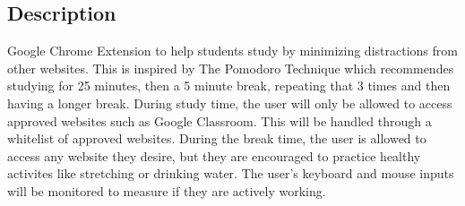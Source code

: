 \documentclass[12pt]{article}
\begin{document}
\subsection{Description}
Google Chrome Extension to help students study by minimizing distractions from other websites.
This is inspired by The Pomodoro Technique which recommendes studying for 25 minutes, then a 5 minute break, repeating that 3 times and then having a longer break.
During study time, the user will only be allowed to access approved websites such as Google Classroom. This will be handled through a whitelist of approved websites.
During the break time, the user is allowed to access any website they desire, but they are encouraged to practice healthy activites like stretching or drinking water.
The user's keyboard and mouse inputs will be monitored to measure if they are actively working.
\end{document}
